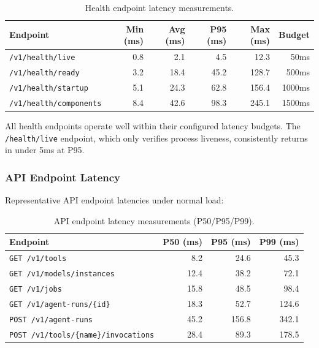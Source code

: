 \begin{table}[ht]
\centering
\caption{Health endpoint latency measurements.}
\label{tab:health-latency}
\small
\begin{tabular}{lrrrrr}
\hline
\textbf{Endpoint} & \textbf{Min (ms)} & \textbf{Avg (ms)} & \textbf{P95 (ms)} & \textbf{Max (ms)} & \textbf{Budget} \\
\hline
\texttt{/v1/health/live} & 0.8 & 2.1 & 4.5 & 12.3 & 50ms \\
\texttt{/v1/health/ready} & 3.2 & 18.4 & 45.2 & 128.7 & 500ms \\
\texttt{/v1/health/startup} & 5.1 & 24.3 & 62.8 & 156.4 & 1000ms \\
\texttt{/v1/health/components} & 8.4 & 42.6 & 98.3 & 245.1 & 1500ms \\
\hline
\end{tabular}
\end{table}

All health endpoints operate well within their configured latency budgets. The \texttt{/health/live} endpoint, which only verifies process liveness, consistently returns in under 5ms at P95.

\subsubsection{API Endpoint Latency}

Representative API endpoint latencies under normal load:

\begin{table}[ht]
\centering
\caption{API endpoint latency measurements (P50/P95/P99).}
\label{tab:api-latency}
\small
\begin{tabular}{lrrr}
\hline
\textbf{Endpoint} & \textbf{P50 (ms)} & \textbf{P95 (ms)} & \textbf{P99 (ms)} \\
\hline
\texttt{GET /v1/tools} & 8.2 & 24.6 & 45.3 \\
\texttt{GET /v1/models/instances} & 12.4 & 38.2 & 72.1 \\
\texttt{GET /v1/jobs} & 15.8 & 48.5 & 98.4 \\
\texttt{GET /v1/agent-runs/\{id\}} & 18.3 & 52.7 & 124.6 \\
\texttt{POST /v1/agent-runs} & 45.2 & 156.8 & 342.1 \\
\texttt{POST /v1/tools/\{name\}/invocations} & 28.4 & 89.3 & 178.5 \\
\hline
\end{tabular}
\end{table}

